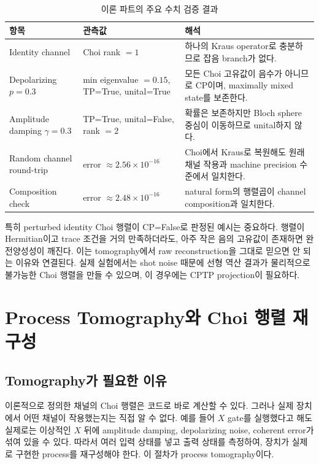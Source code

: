 \documentclass[11pt,a4paper]{article}
\begin{document}
\begin{table}[H]
\centering
\small
\begin{tabularx}{\textwidth}{p{}p{}X}
\toprule
항목 & 관측값 & 해석 \\
\midrule
Identity channel & Choi rank $=1$ & 하나의 Kraus operator로 충분하므로 잡음 branch가 없다. \\
Depolarizing $p=0.3$ & min eigenvalue $=0.15$, TP=True, unital=True & 모든 Choi 고유값이 음수가 아니므로 CP이며, maximally mixed state를 보존한다. \\
Amplitude damping $\gamma=0.3$ & TP=True, unital=False, rank $=2$ & 확률은 보존하지만 Bloch sphere 중심이 이동하므로 unital하지 않다. \\
Random channel round-trip & error $\approx2.56\times10^{-16}$ & Choi에서 Kraus로 복원해도 원래 채널 작용과 machine precision 수준에서 일치한다. \\
Composition check & error $\approx2.48\times10^{-16}$ & natural form의 행렬곱이 channel composition과 일치한다. \\
\bottomrule
\end{tabularx}
\caption{이론 파트의 주요 수치 검증 결과}
\label{tab:theory-results}
\end{table}

특히 perturbed identity Choi 행렬이 CP=False로 판정된 예시는 중요하다. 행렬이 Hermitian이고 trace 조건을 거의 만족하더라도, 아주 작은 음의 고유값이 존재하면 완전양성성이 깨진다. 이는 tomography에서 raw reconstruction을 그대로 믿으면 안 되는 이유와 연결된다. 실제 실험에서는 shot noise 때문에 선형 역산 결과가 물리적으로 불가능한 Choi 행렬을 만들 수 있으며, 이 경우에는 CPTP projection이 필요하다.

\section{Process Tomography와 Choi 행렬 재구성}

\subsection{Tomography가 필요한 이유}

이론적으로 정의한 채널의 Choi 행렬은 코드로 바로 계산할 수 있다. 그러나 실제 장치에서 어떤 채널이 작용했는지는 직접 알 수 없다. 예를 들어 $X$ gate를 실행했다고 해도 실제로는 이상적인 $X$ 뒤에 amplitude damping, depolarizing noise, coherent error가 섞여 있을 수 있다. 따라서 여러 입력 상태를 넣고 출력 상태를 측정하여, 장치가 실제로 구현한 process를 재구성해야 한다. 이 절차가 process tomography이다.
\end{document}
